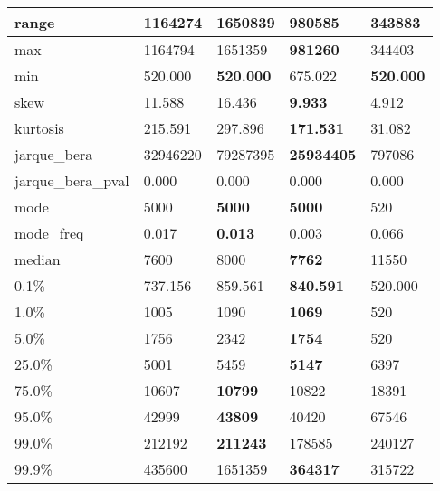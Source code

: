 \begin{table}[H]
\begin{tabular}{|l|m{10em}|m{10em}|m{10em}|m{10em}|}
\hline range & 1164274 & 1650839 & \bfseries 980585 & \cellcolor[rgb]{0.9, 0.54, 0.52} 343883 \\
\hline max & 1164794 & 1651359 & \bfseries 981260 & \cellcolor[rgb]{0.9, 0.54, 0.52} 344403 \\
\hline min & 520.000 & \bfseries 520.000 & \cellcolor[rgb]{0.9, 0.54, 0.52} 675.022 & \bfseries 520.000 \\
\hline skew & 11.588 & 16.436 & \bfseries 9.933 & \cellcolor[rgb]{0.9, 0.54, 0.52} 4.912 \\
\hline kurtosis & 215.591 & 297.896 & \bfseries 171.531 & \cellcolor[rgb]{0.9, 0.54, 0.52} 31.082 \\
\hline jarque\_bera & 32946220 & \cellcolor[rgb]{0.9, 0.54, 0.52} 79287395 & \bfseries 25934405 & 797086 \\
\hline jarque\_bera\_pval & 0.000 & 0.000 & 0.000 & 0.000 \\
\hline mode & 5000 & \bfseries 5000 & \bfseries 5000 & \cellcolor[rgb]{0.9, 0.54, 0.52} 520 \\
\hline mode\_freq & 0.017 & \bfseries 0.013 & 0.003 & \cellcolor[rgb]{0.9, 0.54, 0.52} 0.066 \\
\hline median & 7600 & 8000 & \bfseries 7762 & \cellcolor[rgb]{0.9, 0.54, 0.52} 11550 \\
\hline 0.1\% & 737.156 & 859.561 & \bfseries 840.591 & \cellcolor[rgb]{0.9, 0.54, 0.52} 520.000 \\
\hline 1.0\% & 1005 & 1090 & \bfseries 1069 & \cellcolor[rgb]{0.9, 0.54, 0.52} 520 \\
\hline 5.0\% & 1756 & 2342 & \bfseries 1754 & \cellcolor[rgb]{0.9, 0.54, 0.52} 520 \\
\hline 25.0\% & 5001 & 5459 & \bfseries 5147 & \cellcolor[rgb]{0.9, 0.54, 0.52} 6397 \\
\hline 75.0\% & 10607 & \bfseries 10799 & 10822 & \cellcolor[rgb]{0.9, 0.54, 0.52} 18391 \\
\hline 95.0\% & 42999 & \bfseries 43809 & 40420 & \cellcolor[rgb]{0.9, 0.54, 0.52} 67546 \\
\hline 99.0\% & 212192 & \bfseries 211243 & \cellcolor[rgb]{0.9, 0.54, 0.52} 178585 & 240127 \\
\hline 99.9\% & 435600 & \cellcolor[rgb]{0.9, 0.54, 0.52} 1651359 & \bfseries 364317 & 315722 \\
\hline
\end{tabular}
\end{table}
